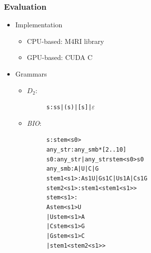 \documentclass[xcolor=table]{beamer}
\begin{document}
\begin{frame}[fragile] \frametitle{Evaluation}
    \begin{itemize}
        \item Implementation
        \begin{itemize}
            \item CPU-based: M4RI library
            \item GPU-based: CUDA C
        \end{itemize}
        \item Grammars
        \begin{itemize}
            \item $D_2$:
            \vspace{-12pt}
            \begin{figure}[t]
            \begin{minipage}{0.4\textwidth}
            \footnotesize
            \begin{alltt}
s: s s | ( s ) | [ s ] | \(\varepsilon \)
            \end{alltt}
            \end{minipage}
            \end{figure}

            \item \textit{BIO}:
            \vspace{-12pt}
            \begin{figure}[t]
            \begin{minipage}{0.4\textwidth}
            \footnotesize
            \begin{alltt}
s: stem<s0>
any_str: any_smb*[2..10]
s0: any_str | any_str stem<s0> s0
any_smb: A | U | C | G
stem1<s1>: A s1 U | G s1 C | U s1 A | C s1 G 
stem2<s1>: stem1<stem1<s1>>
stem<s1>:  
      A stem<s1> U 
    | U stem<s1> A 
    | C stem<s1> G 
    | G stem<s1> C 
    | stem1<stem2<s1>>              
            \end{alltt}
            \end{minipage}
            \end{figure}

        \end{itemize}
        
    \end{itemize}

\end{frame}
\end{document}
